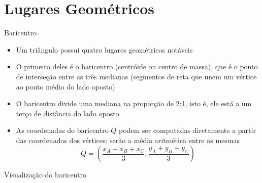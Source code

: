 \section{Lugares Geométricos}

\begin{frame}[fragile]{Baricentro}

    \begin{itemize}
        \item Um triângulo possui quatro lugares geométricos notáveis

        \item O primeiro deles é o baricentro (centróide ou centro de massa), que é o ponto de 
            interseção entre as três medianas (segmentos de reta que unem um vértice ao ponto médio do lado oposto)

        \item O baricentro divide uma mediana na proporção de 2:1, isto é, ele está a um terço de 
            distância do lado oposto

        \item As coordenadas do baricentro $Q$ podem ser computadas diretamente a partir das 
            coordenadas dos vértices: serão a média aritmética entre as mesmas
        \[
            Q = \left(\frac{x_A + x_B + x_C}{3}, \frac{y_A + y_B + y_C}{3}\right)
        \]

    \end{itemize}

\end{frame}

\begin{frame}[fragile]{Visualização do baricentro}

    \begin{figure}
        \centering

    \end{figure}

\end{frame}

